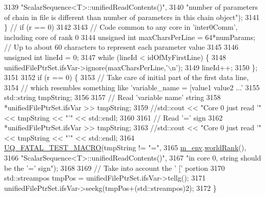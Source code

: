 \begin{DoxyCode}
3139                                   \textcolor{stringliteral}{"ScalarSequence<T>::unifiedReadContents()"},
3140                                   \textcolor{stringliteral}{"number of parameters of chain in file is different than number of
       parameters in this chain object"});
3141             \} \textcolor{comment}{// if (r == 0)}
3142 
3143             \textcolor{comment}{// Code common to any core in 'inter0Comm', including core of rank 0}
3144             \textcolor{keywordtype}{unsigned} \textcolor{keywordtype}{int} maxCharsPerLine = 64*numParams; \textcolor{comment}{// Up to about 60 characters to represent each
       parameter value}
3145 
3146             \textcolor{keywordtype}{unsigned} \textcolor{keywordtype}{int} lineId = 0;
3147             \textcolor{keywordflow}{while} (lineId < idOfMyFirstLine) \{
3148               unifiedFilePtrSet.ifsVar->ignore(maxCharsPerLine,\textcolor{charliteral}{'\(\backslash\)n'});
3149               lineId++;
3150             \};
3151 
3152             \textcolor{keywordflow}{if} (r == 0) \{
3153               \textcolor{comment}{// Take care of initial part of the first data line,}
3154               \textcolor{comment}{// which resembles something like 'variable\_name = [value1 value2 ...'}
3155         std::string tmpString;
3156 
3157               \textcolor{comment}{// Read 'variable name' string}
3158               *unifiedFilePtrSet.ifsVar >> tmpString;
3159           \textcolor{comment}{//std::cout << "Core 0 just read '" << tmpString << "'" << std::endl;}
3160 
3161               \textcolor{comment}{// Read '=' sign}
3162               *unifiedFilePtrSet.ifsVar >> tmpString;
3163         \textcolor{comment}{//std::cout << "Core 0 just read '" << tmpString << "'" << std::endl;}
3164               \hyperlink{_defines_8h_a56d63d18d0a6d45757de47fcc06f574d}{UQ\_FATAL\_TEST\_MACRO}(tmpString != \textcolor{stringliteral}{"="},
3165                                   \hyperlink{class_q_u_e_s_o_1_1_scalar_sequence_a71618cd6351b29361b437af68447a4c8}{m\_env}.\hyperlink{class_q_u_e_s_o_1_1_base_environment_a78b57112bbd0e6dd0e8afec00b40ffa7}{worldRank}(),
3166                                   \textcolor{stringliteral}{"ScalarSequence<T>::unifiedReadContents()"},
3167                                   \textcolor{stringliteral}{"in core 0, string should be the '=' sign"});
3168 
3169               \textcolor{comment}{// Take into account the ' [' portion}
3170         std::streampos tmpPos = unifiedFilePtrSet.ifsVar->tellg();
3171               unifiedFilePtrSet.ifsVar->seekg(tmpPos+(std::streampos)2);
3172             \}

\end{DoxyCode}
